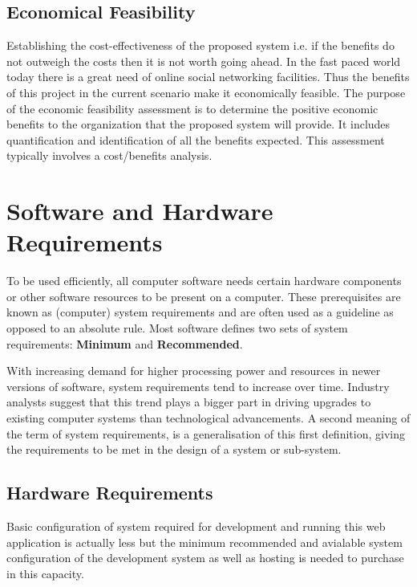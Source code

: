 \documentclass[12pt, a4paper]{report}
\begin{document}
\subsection{Economical Feasibility}
\par Establishing the cost-effectiveness of the proposed system i.e. if the benefits do not outweigh the
costs then it is not worth going ahead. In the fast paced world today there is a great need of online
social networking facilities. Thus the benefits of this project in the current scenario make it
economically feasible. The purpose of the economic feasibility assessment is to determine the
positive economic benefits to the organization that the proposed system will provide. It includes
quantification and identification of all the benefits expected. This assessment typically involves a
cost/benefits analysis.

\newpage
\section{Software and Hardware Requirements}

\par To be used efficiently, all computer software needs certain hardware components or other software resources to be present on a computer. These prerequisites are known as (computer) system requirements and are often used as a guideline as opposed to an absolute rule. Most software defines two sets of system requirements: \textbf{Minimum} and \textbf{Recommended}. \par With increasing demand for higher processing power and resources in newer versions of software, system requirements tend to increase over time. Industry analysts suggest that this trend plays a bigger part in driving upgrades to existing computer systems than technological advancements. A second meaning of the term of system requirements, is a generalisation of this first definition, giving the requirements to be met in the design of a system or sub-system.

\subsection{Hardware Requirements}

Basic configuration of system required for development and running this web application is actually less but the minimum recommended and avialable system configuration of the development system as well as hosting is needed to purchase in this capacity.%
\end{document}
